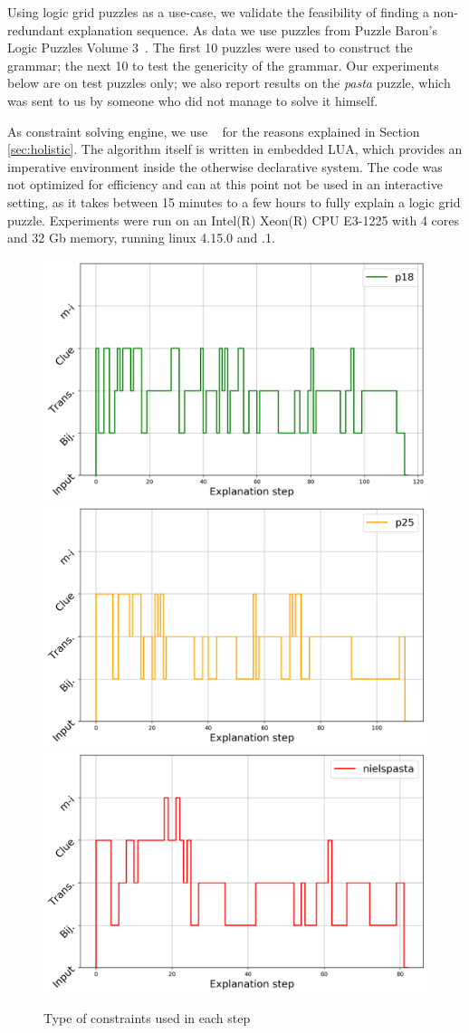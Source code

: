 Using logic grid puzzles as a use-case, we validate the feasibility of finding a non-redundant explanation sequence.
As data we use puzzles from Puzzle Baron’s Logic Puzzles Volume 3~\cite{logigrammen}. The first 10 puzzles were used to construct the grammar; the next 10 to test the genericity of the grammar. 
Our experiments below are on test puzzles only; we also report results on the \textit{pasta} puzzle, which was sent to us by someone who did not manage to solve it himself.

As constraint solving engine, we use \idp~\cite{IDP} for the reasons explained in Section \ref{sec:holistic}. 
The algorithm itself is written in embedded LUA, which provides an imperative environment inside the otherwise declarative \idp system. The code was not optimized for efficiency and can at this point not be used in an interactive setting, as it takes between 15 minutes to a few hours to fully explain a logic grid puzzle. Experiments were run on an Intel(R) Xeon(R) CPU E3-1225 with 4 cores and 32 Gb memory, running linux 4.15.0 and .1.

\begin{figure}[t]
\centering
\includegraphics[width=0.32\linewidth]{figures/plot_cost_steps_p18}
\includegraphics[width=0.32\linewidth]{figures/plot_cost_steps_p25}
\includegraphics[width=0.32\linewidth]{figures/plot_cost_steps_nielspasta}\caption{Type of constraints used in each step}
\label{fig:steps}
\end{figure}

